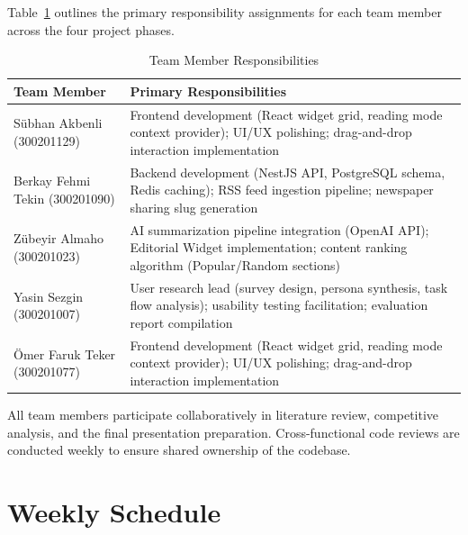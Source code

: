 \documentclass[14pt]{article}
\begin{document}
Table~\ref{tab:responsibilities} outlines the primary responsibility assignments for each team member across the four project phases.

\begin{table}[H]
\centering
\caption{Team Member Responsibilities}
\label{tab:responsibilities}
\renewcommand{\arraystretch}{1.3}
\begin{tabularx}{\textwidth}{l X}
\toprule
\textbf{Team Member} & \textbf{Primary Responsibilities} \\
\midrule
Sübhan Akbenli (300201129)
  & Frontend development (React widget grid, reading mode context provider); UI/UX polishing; drag-and-drop interaction implementation \\
Berkay Fehmi Tekin (300201090)
  & Backend development (NestJS API, PostgreSQL schema, Redis caching); RSS feed ingestion pipeline; newspaper sharing slug generation \\
Zübeyir Almaho (300201023)
  & AI summarization pipeline integration (OpenAI API); Editorial Widget implementation; content ranking algorithm (Popular/Random sections) \\
Yasin Sezgin (300201007)
  & User research lead (survey design, persona synthesis, task flow analysis); usability testing facilitation; evaluation report compilation \\
Ömer Faruk Teker (300201077)
  & Frontend development (React widget grid, reading mode context provider); UI/UX polishing; drag-and-drop interaction implementation \\
\bottomrule
\end{tabularx}
\end{table}

\noindent All team members participate collaboratively in literature review, competitive analysis, and the final presentation preparation. Cross-functional code reviews are conducted weekly to ensure shared ownership of the codebase.

\section{Weekly Schedule}
\end{document}

